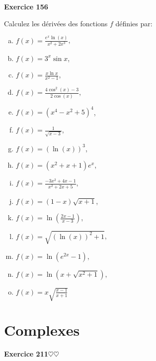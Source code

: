 ﻿\documentclass[11pt,a4paper]{amsart}
\theoremstyle{theorem}
\theoremstyle{definition}
\newcommand{\ccoeur}{$\heartsuit\heartsuit$}
\newcounter{qcounter}
\newcounter{qscounter}
\begin{document}
\setcounter{qcounter}{0} \setcounter{qscounter}{0}\textbf{Exercice 156}\begin{exo}{}{}
Calculez les dérivées des fonctions $f$ définies par:


\begin{enumerate}[(a)]
\item $  f(x)=\frac{e^x \ln(x) }{x^2+2x^3}$,%
\item $ f(x)= 3^x \sin x $,%
\item $ f(x)= \frac{x\ln x}{x^2-1}$, %
\item $f(x)=\frac{4\cos^2(x)-3}{2\cos(x)}$, %
\item $f(x)=(x^4-x^2+5)^4$, %
\item $f(x)=\frac{1}{\sqrt{x-3}}$, %
\item $f(x)=(\ln(x))^3$,%
\item $f(x)=(x^2+x+1)e^x$, %
\item $f(x)=\frac{-3x^2+4x-1}{x^2+2x+5}$, %
\item $f(x)=(1-x)\sqrt{x+1}$, %
\item $f(x)=\ln(\frac{2x-1}{x-3})$,%
\item $f(x)=\sqrt{(\ln(x))^2 +1}$,%
\item $f(x)=\ln(e^{2x}-1)$, %
\item $f(x)=\ln(x+\sqrt{x^2+1})$, %
\item $f(x)=x\sqrt{\frac{x-1}{x+1}}$
\end{enumerate}
\end{exo}


\section{Complexes}

\setcounter{qcounter}{0} \setcounter{qscounter}{0}\textbf{Exercice 211}{\ccoeur}
\end{document}
